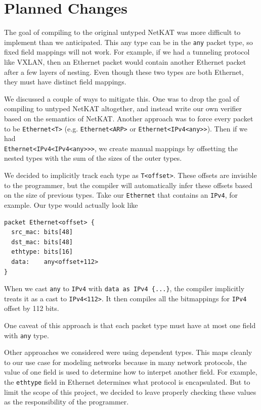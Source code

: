 \documentclass[acmsmall,screen,nonacm]{acmart}
\begin{document}
\section{Planned Changes}
The goal of compiling to the original untyped NetKAT was more difficult
to implement than we anticipated. This any type can be in the \texttt{any}
packet type, so fixed field mappings will not work. For example, if we had
a tunneling protocol like VXLAN, then an Ethernet packet would contain
another Ethernet packet after a few layers of nesting. Even though these
two types are both Ethernet, they must have distinct field mappings.

We discussed a couple of ways to mitigate this. One was to drop the
goal of compiling to untyped NetKAT altogether, and instead write our
own verifier based on the semantics of NetKAT. Another approach was to
force every packet to be \texttt{Ethernet<T>} (e.g. \texttt{Ethernet<ARP>} or \texttt{Ethernet<IPv4<any>>}). Then if we had \\\texttt{Ethernet<IPv4<IPv4<any>>>}, we create manual mappings by offsetting
the nested types with the sum of the sizes of the outer types.

We decided to implicitly track each type as \texttt{T<offset>}. These
offsets are invisible to the programmer, but the compiler will
automatically infer these offsets based on the size of previous
types. Take our \texttt{Ethernet} that contains an \texttt{IPv4},
for example. Our type would actually look like

\begin{verbatim}
packet Ethernet<offset> {
  src_mac: bits[48]
  dst_mac: bits[48]
  ethtype: bits[16]
  data:    any<offset+112>
}
\end{verbatim}

When we cast \texttt{any} to \texttt{IPv4} with 
\texttt{data as IPv4 \{...\}}, the compiler implicitly treats it as a cast 
to \texttt{IPv4<112>}. It then compiles all the bitmappings for 
\texttt{IPv4} offset by 112 bits.

One caveat of this approach is that each packet type must have at most one
field with \texttt{any} type.

Other approaches we considered were using dependent types. This maps
cleanly to our use case for modeling networks because in many network
protocols, the value of one field is used to determine how to interpet
another field. For example, the \texttt{ethtype} field in Ethernet
determines what protocol is encapsulated. But to limit the scope of this
project, we decided to leave properly checking these values as the
responsibility of the programmer.




\end{document}
